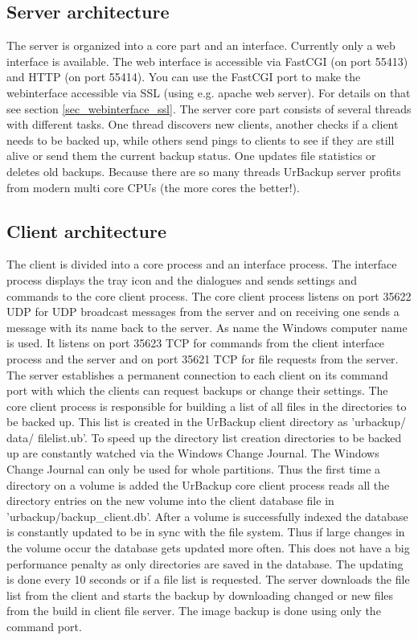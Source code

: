 \documentclass[a4paper,10pt]{article}
\begin{document}
\subsection{Server architecture}

The server is organized into a core part and an interface. Currently only a
web interface is available. The web interface is accessible via FastCGI (on port
55413) and HTTP (on port 55414). You can use the FastCGI port to make the
webinterface accessible via SSL (using e.g. apache web server). For details on
that see section \ref{sec_webinterface_ssl}. The server core part consists of
several threads with different tasks. One thread discovers new clients, another
checks if a client needs to be backed up, while others send pings to clients to
see if they are still alive or send them the current backup status. One updates
file statistics or deletes old backups. Because there are so many threads
UrBackup server profits from modern multi core CPUs (the more cores the
better!).

\subsection{Client architecture}

The client is divided into a core process and an interface process. The
interface process displays the tray icon and the dialogues and sends settings and
commands to the core client process. The core client process listens on port
35622 UDP for UDP broadcast messages from the server and on receiving one sends
a message with its name back to the server. As name the Windows computer name is
used. It listens on port 35623 TCP for commands from the client interface
process and the server and on port 35621 TCP for file requests from the server.
The server establishes a permanent connection to each client on its command port
with which the clients can request backups or change their settings. The core
client process is responsible for building a list of all files in the
directories to be backed up. This list is created in the UrBackup client
directory as 'urbackup/ data/ filelist.ub'. To speed up the directory list
creation directories to be backed up are constantly watched via the Windows
Change Journal. The Windows Change Journal can only be used for whole
partitions. Thus the first time a directory on a volume is added the UrBackup
core client process reads all the directory entries on the new volume into the
client database file in 'urbackup/backup\_client.db'. After a volume is
successfully indexed the database is constantly updated to be in sync with the
file system. Thus if large changes in the volume occur the database gets updated
more often. This does not have a big performance penalty as only directories are
saved in the database. The updating is done every 10 seconds or if a file list
is requested. The server downloads the file list from the client and starts the
backup by downloading changed or new files from the build in client file server.
The image backup is done using only the command port.
\end{document}
